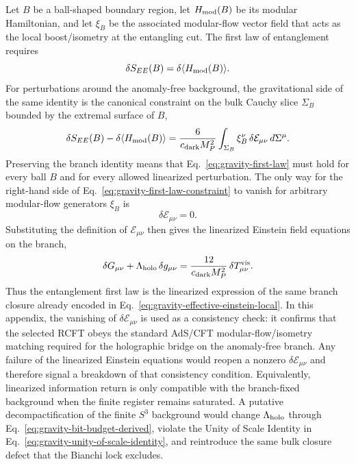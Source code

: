 \documentclass[11pt]{article}
\begin{document}
Let $B$ be a ball-shaped boundary region, let $H_{\rm mod}(B)$ be its modular Hamiltonian, and let $\xi_B$ be the associated modular-flow vector field that acts as the local boost/isometry at the entangling cut. The first law of entanglement requires
\begin{equation}
\label{eq:gravity-first-law}
 \delta S_{EE}(B)=\delta\langle H_{\rm mod}(B)\rangle.
\end{equation}
For perturbations around the anomaly-free background, the gravitational side of the same identity is the canonical constraint on the bulk Cauchy slice $\Sigma_B$ bounded by the extremal surface of $B$,
\begin{equation}
\label{eq:gravity-first-law-constraint}
 \delta S_{EE}(B)-\delta\langle H_{\rm mod}(B)\rangle
 =
 \frac{6}{c_{\rm dark}M_P^2}
 \int_{\Sigma_B}
 \xi_B^{\nu}\,\delta\mathcal E_{\mu\nu}
 \, d\Sigma^{\mu}.
\end{equation}
Preserving the branch identity means that Eq.~\eqref{eq:gravity-first-law} must hold for every ball $B$ and for every allowed linearized perturbation. The only way for the right-hand side of Eq.~\eqref{eq:gravity-first-law-constraint} to vanish for arbitrary modular-flow generators $\xi_B$ is
\begin{equation}
\label{eq:gravity-linearized-closure}
 \delta\mathcal E_{\mu\nu}=0.
\end{equation}
Substituting the definition of $\mathcal E_{\mu\nu}$ then gives the linearized Einstein field equations on the branch,
\begin{equation}
\label{eq:gravity-linearized-efe}
 \delta G_{\mu\nu}+\Lambda_{\rm holo}\,\delta g_{\mu\nu}
 =
 \frac{12}{c_{\rm dark}M_P^2}\,\delta T^{\rm vis}_{\mu\nu}.
\end{equation}
Thus the entanglement first law is the linearized expression of the same branch closure already encoded in Eq.~\eqref{eq:gravity-effective-einstein-local}. In this appendix, the vanishing of $\delta\mathcal E_{\mu\nu}$ is used as a consistency check: it confirms that the selected RCFT obeys the standard AdS/CFT modular-flow/isometry matching required for the holographic bridge on the anomaly-free branch. Any failure of the linearized Einstein equations would reopen a nonzero $\delta\mathcal E_{\mu\nu}$ and therefore signal a breakdown of that consistency condition.
Equivalently, linearized information return is only compatible with the
branch-fixed background when the finite register remains saturated. A putative
decompactification of the finite $S^3$ background would change
$\Lambda_{\rm holo}$ through Eq.~\eqref{eq:gravity-bit-budget-derived}, violate
the Unity of Scale Identity in Eq.~\eqref{eq:gravity-unity-of-scale-identity},
and reintroduce the same bulk closure defect that the Bianchi lock excludes.
\end{document}
